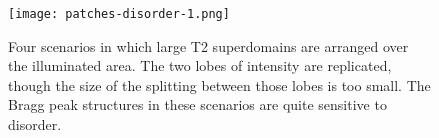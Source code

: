 \documentclass[aps, prb, reprint, showpacs, superscriptaddress]{revtex4-1}
\begin{document}
\begin{figure}[ht]
\begin{center}
\texttt{[image: patches-disorder-1.png]}
\caption {
Four scenarios in which large T2 superdomains are arranged over the illuminated area.
The two lobes of intensity are replicated, though the size of the splitting between those lobes is too small.
The Bragg peak structures in these scenarios are quite sensitive to disorder.
}  \label{patches}
\end{center}
\end{figure}



\end{document}
